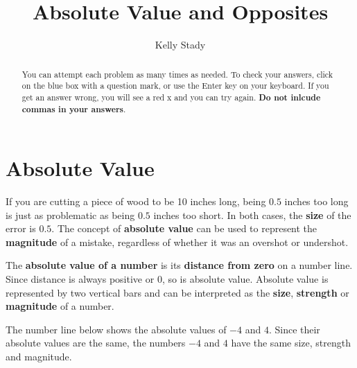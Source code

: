 \documentclass{ximera}[font=12pt]
\title{Absolute Value and Opposites}   %
\author{Kelly Stady}
\begin{document}
   

\begin{abstract}
You can attempt each problem as many times as needed. To check your answers, click on the 
blue box with a question mark, or use the Enter key on your keyboard.  If you get an answer wrong, you will see a red x and 
you can try again. \textbf{Do not inlcude commas in your answers}.

\end{abstract}


\maketitle

\label{xim:AbsValue}


\section*{Absolute Value}

If you are cutting a piece of wood to be 10 inches long, being $0.5$ inches too long is just as problematic as being $0.5$ inches too short. In 
both cases, the \textbf{size} of the error is $0.5.$  The concept of \textbf{absolute value} can be used to represent the \textbf{magnitude} of a mistake, regardless 
of whether it was an overshot or undershot.

The \textbf{absolute value of a number} is its \textbf{distance from zero} on a number line.  Since distance is always positive or 0, so is 
absolute value.  Absolute value is represented by two vertical bars and can be interpreted as the \textbf{size}, \textbf{strength} or 
\textbf{magnitude} of a number.

The number line below shows the absolute values of $-4$ and $4.$  Since their absolute values are the same, the numbers $-4$ and $4$ have the 
same size, strength and magnitude.
\end{document}
